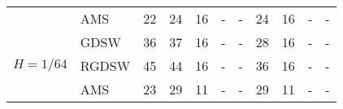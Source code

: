 \begin{table}[H]
\begin{tabular}{llrrrllrrll}
\cline{2-11}
\bfseries  & AMS & 22 & {\cellcolor[HTML]{405FE5}} \color[HTML]{F1F1F1} 24 & 16 & {\cellcolor[HTML]{ACB8F4}} \color[HTML]{000000} {\cellcolor[HTML]{E2E4FB}} - & - & {\cellcolor[HTML]{768BEC}} \color[HTML]{F1F1F1} 24 & 16 & {\cellcolor[HTML]{E2E4FB}} \color[HTML]{000000} {\cellcolor[HTML]{E2E4FB}} - & - \\
\cline{1-11} \cline{2-11}
\multirow[c]{3}{*}{\bfseries $H=1/64$} & GDSW & 36 & {\cellcolor[HTML]{405FE5}} \color[HTML]{F1F1F1} 37 & 16 & {\cellcolor[HTML]{ACB8F4}} \color[HTML]{000000} {\cellcolor[HTML]{E2E4FB}} - & - & {\cellcolor[HTML]{768BEC}} \color[HTML]{F1F1F1} 28 & 16 & {\cellcolor[HTML]{E2E4FB}} \color[HTML]{000000} {\cellcolor[HTML]{E2E4FB}} - & - \\
\cline{2-11}
\bfseries  & RGDSW & 45 & {\cellcolor[HTML]{405FE5}} \color[HTML]{F1F1F1} 44 & 16 & {\cellcolor[HTML]{ACB8F4}} \color[HTML]{000000} {\cellcolor[HTML]{E2E4FB}} - & - & {\cellcolor[HTML]{768BEC}} \color[HTML]{F1F1F1} 36 & 16 & {\cellcolor[HTML]{E2E4FB}} \color[HTML]{000000} {\cellcolor[HTML]{E2E4FB}} - & - \\
\cline{2-11}
\bfseries  & AMS & 23 & {\cellcolor[HTML]{405FE5}} \color[HTML]{F1F1F1} 29 & 11 & {\cellcolor[HTML]{ACB8F4}} \color[HTML]{000000} {\cellcolor[HTML]{E2E4FB}} - & - & {\cellcolor[HTML]{768BEC}} \color[HTML]{F1F1F1} 29 & 11 & {\cellcolor[HTML]{E2E4FB}} \color[HTML]{000000} {\cellcolor[HTML]{E2E4FB}} - & - \\
\cline{1-11} \cline{2-11}
\bottomrule
\end{tabular}
\end{table}
